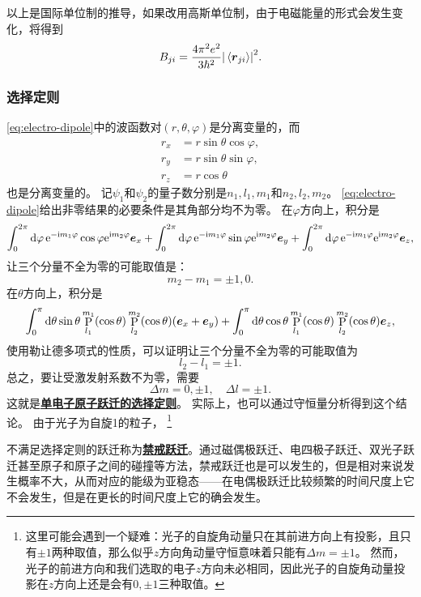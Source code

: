 \documentclass[UTF8, a4paper]{ctexart}
\newcommand*{\ee}{\mathrm{e}}
\newcommand*{\ii}{\mathrm{i}}
\DeclareMathOperator{\legpoly}{P}
\newcommand*{\concept}[1]{\underline{\textbf{#1}}}
\begin{document}
以上是国际单位制的推导，如果改用高斯单位制，由于电磁能量的形式会发生变化，将得到
\begin{equation}
    B_{ji} = \frac{4\pi^2 e^2}{3 \hbar^2} \abs{\expval*{\vb*{r}_{ji}}}^2.
\end{equation}

\subsubsection{选择定则}

\eqref{eq:electro-dipole}中的波函数对$(r, \theta, \varphi)$是分离变量的，而
\[
    \begin{aligned}
        r_x &= r \sin \theta \cos \varphi, \\
        r_y &= r \sin \theta \sin \varphi, \\
        r_z &= r \cos \theta 
    \end{aligned}
\]
也是分离变量的。
记$\psi_1$和$\psi_2$的量子数分别是$n_1, l_1, m_1$和$n_2, l_2, m_2$。
\eqref{eq:electro-dipole}给出非零结果的必要条件是其角部分均不为零。
在$\varphi$方向上，积分是
\[
    \int_0^{2\pi} \dd{\varphi} \ee^{ - \ii m_1 \varphi} \cos \varphi \ee^{\ii m_2 \varphi} \vb*{e}_x + \int_0^{2\pi} \dd{\varphi} \ee^{ - \ii m_1 \varphi} \sin \varphi \ee^{\ii m_2 \varphi} \vb*{e}_y + \int_0^{2\pi} \dd{\varphi} \ee^{ - \ii m_1 \varphi} \ee^{\ii m_2 \varphi} \vb*{e}_z,
\]
让三个分量不全为零的可能取值是：
\[
    m_2 - m_1 = \pm 1, 0.
\]
在$\theta$方向上，积分是
\[
    \int_0^\pi \dd{\theta} \sin \theta \legpoly_{l_1}^{m_1} (\cos \theta) \legpoly_{l_2}^{m_2} (\cos \theta) (\vb*{e}_x + \vb*{e}_y) + \int_0^\pi \dd{\theta} \cos \theta \legpoly_{l_1}^{m_1} (\cos \theta) \legpoly_{l_2}^{m_2} (\cos \theta) \vb*{e}_z,
\]
使用勒让德多项式的性质，可以证明让三个分量不全为零的可能取值为
\[
    l_2 - l_1 = \pm 1.
\]
总之，要让受激发射系数不为零，需要
\begin{equation}
    \Delta m = 0, \pm 1, \quad \Delta l = \pm 1.
\end{equation}
这就是\concept{单电子原子跃迁的选择定则}。
实际上，也可以通过守恒量分析得到这个结论。
由于光子为自旋1的粒子，%
\footnote{这里可能会遇到一个疑难：光子的自旋角动量只在其前进方向上有投影，且只有$\pm 1$两种取值，那么似乎$z$方向角动量守恒意味着只能有$\Delta m = \pm 1$。
然而，光子的前进方向和我们选取的电子$z$方向未必相同，因此光子的自旋角动量投影在$z$方向上还是会有$0, \pm 1$三种取值。
}%

不满足选择定则的跃迁称为\concept{禁戒跃迁}。通过磁偶极跃迁、电四极子跃迁、双光子跃迁甚至原子和原子之间的碰撞等方法，禁戒跃迁也是可以发生的，但是相对来说发生概率不大，从而对应的能级为亚稳态——在电偶极跃迁比较频繁的时间尺度上它不会发生，但是在更长的时间尺度上它的确会发生。
\end{document}
